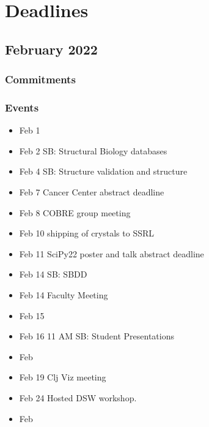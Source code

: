 
\chapter{Deadlines}

\section{February 2022}

\subsection{Commitments}



\subsection{Events}
\begin{itemize}
    \item Feb 1 
    \item Feb 2 SB: Structural Biology databases
    \item Feb 4 SB: Structure validation and structure
    \item Feb 7 Cancer Center abstract deadline
    \item Feb 8 COBRE group meeting
    \item Feb 10 shipping of crystals to SSRL
    \item Feb 11 SciPy22 poster and talk abstract deadline
    \item Feb 14 SB: SBDD
    \item Feb 14 Faculty Meeting
    \item Feb 15 
    \item Feb 16 11 AM SB: Student Presentations
    \item Feb 
    \item Feb 19 Clj Viz meeting
    \item Feb 24 Hosted DSW workshop.
    \item Feb 
\end{itemize}
